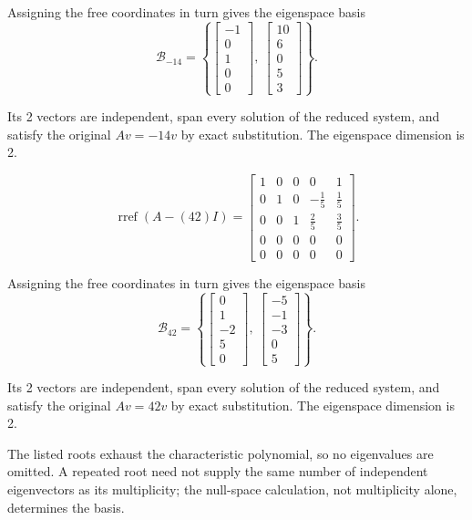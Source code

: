 Assigning the free coordinates in turn gives the eigenspace basis
\[ \mathcal B_{-14}=\left\{\begin{bmatrix}-1\\0\\1\\0\\0\end{bmatrix},\ \begin{bmatrix}10\\6\\0\\5\\3\end{bmatrix}\right\}.\]

Its 2 vectors are independent, span every solution of the reduced system, and satisfy the original $Av=-14v$ by exact substitution. The eigenspace dimension is 2.

\[ \operatorname{rref}(A-(42)I)=\begin{bmatrix}1 & 0 & 0 & 0 & 1\\0 & 1 & 0 & - \frac{1}{5} & \frac{1}{5}\\0 & 0 & 1 & \frac{2}{5} & \frac{3}{5}\\0 & 0 & 0 & 0 & 0\\0 & 0 & 0 & 0 & 0\end{bmatrix}.\]

Assigning the free coordinates in turn gives the eigenspace basis
\[ \mathcal B_{42}=\left\{\begin{bmatrix}0\\1\\-2\\5\\0\end{bmatrix},\ \begin{bmatrix}-5\\-1\\-3\\0\\5\end{bmatrix}\right\}.\]

Its 2 vectors are independent, span every solution of the reduced system, and satisfy the original $Av=42v$ by exact substitution. The eigenspace dimension is 2.

The listed roots exhaust the characteristic polynomial, so no eigenvalues are omitted. A repeated root need not supply the same number of independent eigenvectors as its multiplicity; the null-space calculation, not multiplicity alone, determines the basis.
